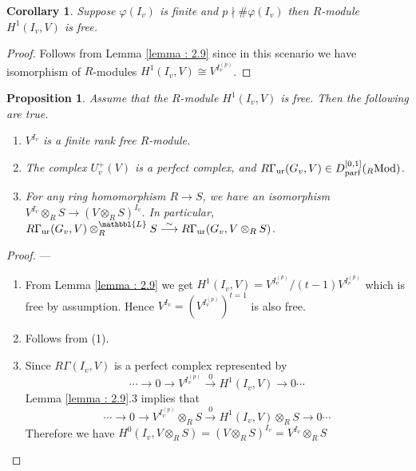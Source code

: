 \documentclass[10pt]{amsart}
\numberwithin{equation}{section}
\newtheorem{cor}[thm]{Corollary}
\newtheorem{prop}[thm]{Proposition}
\theoremstyle{definition}
\theoremstyle{remark} %
\begin{document}
	\begin{cor}
		\label{cor : 2.10}
		Suppose $ \varphi(I_{v}) $ is finite and $ p \nmid \#\varphi(I_{v}) $ then $ R $-module $ H^1(I_{v},V) $ is free.
	\end{cor}
	\begin{proof}
		Follows from Lemma \ref{lemma : 2.9} since in this scenario we have isomorphism of $ R $-modules $ H^1(I_v, V) \cong V^{I_v^{(p)}} $.
	\end{proof}
	\begin{prop}
		\label{prop_unramified_complex}
		Assume that the $R$-module $H^1(I_v, V)$ is free. Then the following are true. 
		\begin{enumerate}
			\item[(1)] $V^{I_v}$ is a finite rank free $R$-module.
			\item[(2)] The complex $U_v^+(V)$ is a perfect complex, and $R\Gamma_{\mathrm{ur}}(G_v, V) \in D^{[0,1]}_{\rm parf}(_R\mathrm{Mod})$.  
			\item[(3)]  For any ring homomorphism $R \to S$, we have an isomorphism $V^{I_v} \otimes_R S \to (V \otimes_R S)^{I_v}$. 
			In particular, $R\Gamma_{\mathrm{ur}}(G_v, V) \otimes^{\mathbbl{L}}_{R} S \stackrel{\sim}{\longrightarrow} R\Gamma_{\mathrm{ur}}(G_v, V \otimes_R S)$. 
		\end{enumerate}
	\end{prop}
	\begin{proof}
		---
		\begin{enumerate}[(1)]
			\item From Lemma \ref{lemma : 2.9} we get $H^1(I_v, V) = V^{I_v^{(p)}}/ (t-1)V^{I_v^{(p)}} $ which is free by assumption. Hence $ V^{I_v} = (V^{I_v^{(p)}})^{t=1} $ is also free.
			\item Follows from (1).
			\item Since $ R\Gamma(I_v,V) $ is a perfect complex represented by
			\[\cdots\rightarrow 0 \rightarrow V^{I_v^{(p)}} \xrightarrow{0} H^1(I_v,V) \rightarrow 0 \cdots \]
			Lemma \ref{lemma : 2.9}.3 implies that
			\[\cdots\rightarrow 0 \rightarrow V^{I_v^{(p)}} \otimes_R S \xrightarrow{0} H^1(I_v,V)\otimes_R S \rightarrow 0 \cdots \] Therefore we have   $H^0(I_v,V\otimes_R S) = (V \otimes_R S)^{I_v} = V^{I_v} \otimes_R S$ 
		\end{enumerate}
	\end{proof}
	
	
	
	
	
\end{document}
